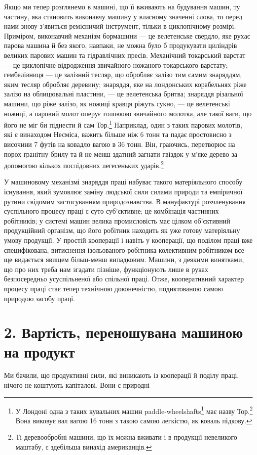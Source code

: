 Якщо ми тепер розглянемо в машині, що її вживають на будування
машин, ту частину, яка становить виконавчу машину у
власному значенні слова, то перед нами знову з’явиться ремісничий
інструмент, тільки в циклопічному розмірі. Приміром, виконавчий
механізм бормашини — це велетенське свердло, яке рухає
парова машина й без якого, навпаки, не можна було б продукувати
циліндрів великих парових машин та гідравлічних пресів.
Механічний токарський варстат — це циклопічне відродження
звичайного ножаного токарського варстату; гембелівниця — це
залізний тесляр, що обробляє залізо тим самим знаряддям, яким
тесляр обробляє деревину; знаряддя, яке на лондонських корабельнях
ріже залізо на облицювальні пластини, — це велетенська
бритва; знаряддя різальної машини, що ріже залізо, як ножиці
кравця ріжуть сукно, — це велетенські ножиці, а паровий молот
оперує головкою звичайного молотка, але такої ваги, що його
не міг би піднести й сам Тор.\footnote{
У Лондоні одна з таких кувальних машин paddle-wheelshafts\footnote*{
— валів до лопатевих коліс. \emph{Ред.}
}
має назву Тор.\footnote*{
Ім’я скандінавського бога блискавки, що його уявляли з великим
молотом у руці. \emph{Ред.}
} Вона виковує вал вагою 16 тонн з такою самою легкістю,
як коваль підкову.
} Наприклад, один з таких парових
молотів, які є винаходом Несміса, важить більше ніж 6 тонн
та падає простовисно з височини 7 футів на ковадло вагою в
36 тонн. Він, граючись, перетворює на порох ґранітну брилу та
й не менш здатний загнати гвіздок у м’яке дерево за допомогою
кількох послідовних легесеньких ударів.\footnote{
Ті деревообробні машини, що їх можна вживати і в продукції
невеликого маштабу, є здебільша винахід американців.
}

У машиновому механізмі знаряддя праці набуває такого матеріяльного
способу існування, який зумовлює заміну людської
сили силами природи та емпіричної рутини свідомим застосуванням
природознавства. В мануфактурі розчленування суспільного
процесу праці є суто суб’єктивне; це комбінація частинних робітників;
у системі машин велика промисловість має цілком об’єктивний
продукційний організм, що його робітник находить як
уже готову матеріяльну умову продукції. У простій кооперації і
навіть у кооперації, що поділом праці вже специфікована, витиснення
ізольованого робітника колективним робітником все ще
видається явищем більш-менш випадковим. Машини, з деякими
винятками, що про них треба нам згадати пізніше, функціонують
лише в руках безпосередньо усуспільненої або спільної праці.
Отже, кооперативний характер процесу праці стає тепер технічною
доконечністю, подиктованою самою природою засобу праці.

\section*{2. Вартість, переношувана машиною на продукт}

Ми бачили, що продуктивні сили, які виникають із кооперації
й поділу праці, нічого не коштують капіталові. Вони є природні
\parbreak{}  %
